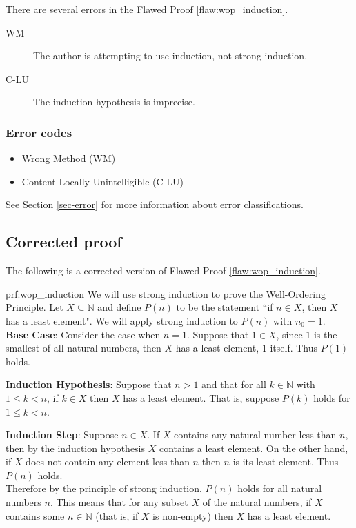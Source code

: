 There are several errors
 in the Flawed Proof \ref{flaw:wop_induction}. 
 
 \begin{description}
    \item[WM] The author is attempting to use induction, not strong induction.  
    \item[C-LU] The induction hypothesis is imprecise.
 \end{description}

 
\subsubsection{Error codes}
\begin{itemize}
	\item Wrong Method (WM)
	\item Content Locally Unintelligible (C-LU)
\end{itemize}
See Section \ref{sec-error} for more information about error classifications.

\clearpage
\subsection{Corrected proof}

The following is a corrected version of Flawed Proof \ref{flaw:wop_induction}. 

\begin{prf}{prf:wop_induction} 
We will use strong induction to prove the Well-Ordering Principle. Let $X \subseteq \mathbb{N}$ and define $P(n)$ to be the statement ``if $n \in X$, then $X$ has a least element". We will apply strong induction to $P(n)$ with $n_0 = 1$. \\

\noindent\textbf{Base Case}: Consider the case when $n=1$.  Suppose that $1 \in X$, since $1$ is the smallest of all natural numbers, then $X$ has a least element, 1 itself. Thus $P(1)$ holds. 

\noindent\textbf{Induction Hypothesis}: Suppose that $n > 1$ and that for all $k \in \mathbb{N}$ with $1 \leq k < n$, if $k \in X$ then $X$ has a least element. That is, suppose $P(k)$ holds for $1 \leq k < n$. 

\noindent\textbf{Induction Step}: Suppose $n \in X$. If $X$ contains any natural number less than $n$, then by the induction hypothesis $X$ contains a least element. On the other hand, if $X$ does not contain any element less than $n$ then $n$ is its least element. Thus $P(n)$ holds.  \\


Therefore by the principle of strong induction, $P(n)$ holds for all natural numbers $n$. This means that for any subset $X$ of the natural numbers, if $X$ contains some $n \in \mathbb{N}$ (that is, if $X$ is non-empty) then $X$ has a least element. 


\end{prf}
